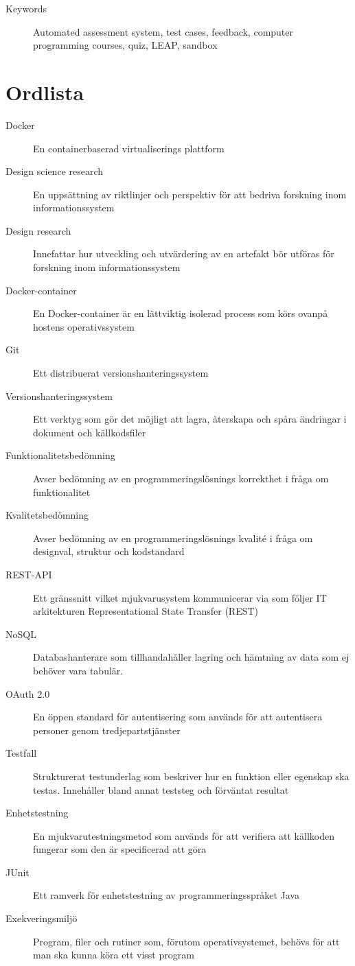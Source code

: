 \documentclass[a4paper,11pt]{article}
\begin{document}
{\begin{description}
    \item[Keywords] Automated assessment system, test cases, feedback, computer programming courses, quiz, LEAP, sandbox
\end{description}

\newpage

\section*{Ordlista}
\begin{description}
    \item [Docker] En containerbaserad virtualiserings plattform
    \item [Design science research] En uppsättning av riktlinjer och perspektiv för att bedriva forskning inom informationssystem
    \item [Design research] Innefattar hur utveckling och utvärdering av en artefakt bör utföras för forskning inom informationssystem
    \item [Docker-container] En Docker-container är en lättviktig isolerad process som körs ovanpå hostens operativssystem
    \item [Git] Ett distribuerat versionshanteringssystem
    \item [Versionshanteringssystem] Ett verktyg som gör det möjligt att lagra, återskapa och spåra ändringar i dokument och källkodsfiler
    \item [Funktionalitetsbedömning] Avser bedömning av en programmeringslösnings korrekthet i fråga om funktionalitet
    \item [Kvalitetsbedömning] Avser bedömning av en programmeringslösnings kvalité i fråga om designval, struktur och kodstandard 
    \item [REST-API] Ett gränssnitt vilket mjukvarusystem kommunicerar via som följer IT arkitekturen Representational State Transfer (REST)
    \item [NoSQL] Databashanterare som tillhandahåller lagring och hämtning av data som ej behöver vara tabulär.
    \item [OAuth 2.0] En öppen standard för autentisering som används för att autentisera personer genom tredjepartstjänster
    \item [Testfall] Strukturerat testunderlag som beskriver hur en funktion eller egenskap ska testas. Innehåller bland annat teststeg och förväntat resultat
    \item [Enhetstestning] En mjukvarutestningsmetod som används för att verifiera att källkoden fungerar som den är specificerad att göra
    \item [JUnit] Ett ramverk för enhetstestning av programmeringsspråket Java
    \item [Exekveringsmiljö] Program, filer och rutiner som, förutom operativsystemet, behövs för att man ska kunna köra ett visst program
\end{description}


}
\end{document}
